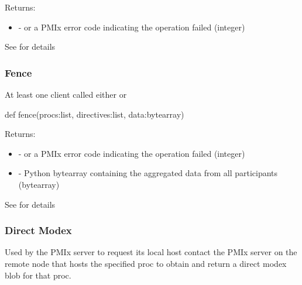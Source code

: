 Returns:
\begin{itemize}
    \item {} -  or a \ac{PMIx} error code indicating the operation failed (integer)
\end{itemize}

See  for details


\subsubsection{Fence}

\summary

At least one client called either  or 

\format

\pyspecificstart
\begin{codepar}
def fence(procs:list, directives:list, data:bytearray)
\end{codepar}
\pyspecificend

\begin{arglist}
\end{arglist}

Returns:
\begin{itemize}
    \item {} -  or a \ac{PMIx} error code indicating the operation failed (integer)
    \item {} - Python bytearray containing the aggregated data from all participants (bytearray)
\end{itemize}

See  for details

\subsubsection{Direct Modex}

\summary

Used by the PMIx server to request its local host contact the \ac{PMIx} server on the remote node that hosts the specified proc to obtain and return a direct modex blob for that proc.

\format

